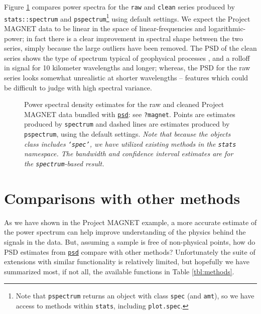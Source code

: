 \documentclass[10pt]{article}\usepackage[]{graphicx}\usepackage[]{color}
\newcommand{\Rcmd}[1]{\texttt{#1}}
\newcommand{\psd}[0]{\href{http://www.github.com/abarbour/psd/}{\color{blue}\Rcmd{psd}}}
\begin{document}
Figure \ref{fig:pmag} compares power spectra for the \Rcmd{raw} and \Rcmd{clean} 
series produced by \Rcmd{stats::spectrum} and \Rcmd{pspectrum}\footnote{
  Note that \Rcmd{pspectrum} returns an object with class \Rcmd{spec} (and \Rcmd{amt}), so 
  we have access to methods within \Rcmd{stats}, including \Rcmd{plot.spec}.
} using default settings.
%
We expect the Project MAGNET data to be linear in the space of
linear-frequencies and logarithmic-power; in fact there is a clear
improvement in spectral shape between the two series,
simply because the large outliers have been removed.
%
The PSD of the clean series shows the type of spectrum typical of 
geophysical processes \citep{agnew1992}, and a rolloff in signal
for 10 kilometer wavelengths and longer; whereas, the 
PSD for the raw series looks somewhat unrealistic at shorter wavelengths -- features 
which could be difficult to judge with high spectral variance.

\begin{figure}[!htbp]
\begin{center}

\caption{Power spectral density estimates for the raw and cleaned
         Project MAGNET data bundled with \psd{}: see \Rcmd{?magnet}. 
         Points are estimates produced by \Rcmd{spectrum} and
         dashed lines are estimates produced by \Rcmd{pspectrum}, using the
         default settings.
         \emph{Note that because the objects class includes \Rcmd{`spec'}, we have
         utilized existing methods in the \Rcmd{stats} namespace. The bandwidth
         and confidence interval estimates are for the \Rcmd{spectrum}-based result.}
}
\label{fig:pmag}
\end{center}
\end{figure}

\clearpage

\section{Comparisons with other methods}

As we have shown in the Project MAGNET example, a more accurate estimate
of the power spectrum can help improve understanding of the physics 
behind the signals in the data.
But, assuming a sample is free of non-physical points, how do
PSD estimates from \psd{} compare with other methods?
Unfortunately the suite of extensions with similar functionality
is relatively limited, but hopefully we have
summarized most, if not all, the available functions in Table \ref{tbl:methods}.
\end{document}
